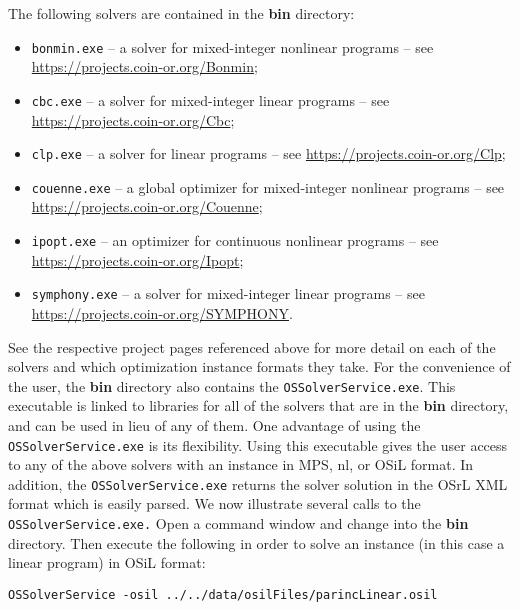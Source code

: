 \documentclass[11pt]{article}
\renewcommand{\{}{{\char"7B}}
\renewcommand{\}}{{\char"7D}}
\renewcommand{\^}{{\char"0D}}
\renewcommand{\'}{{\char"0D}}
\begin{document}
The following solvers are contained in the {\bf bin} directory:
\begin{itemize}
\item {\tt bonmin.exe} -- a solver for mixed-integer nonlinear programs
  -- see \url{https://projects.coin-or.org/Bonmin};

\item {\tt cbc.exe} --  a solver for mixed-integer linear programs
  -- see \url{https://projects.coin-or.org/Cbc};

\item {\tt clp.exe} -- a solver for linear programs
  -- see \url{https://projects.coin-or.org/Clp};

\item {\tt couenne.exe} -- a global optimizer for mixed-integer nonlinear programs
  -- see \url{https://projects.coin-or.org/Couenne};

\item {\tt ipopt.exe} -- an optimizer for continuous nonlinear programs
  -- see \url{https://projects.coin-or.org/Ipopt};

\item {\tt symphony.exe} -- a solver for mixed-integer linear programs
  -- see \url{https://projects.coin-or.org/SYMPHONY}.
\end{itemize}

See the respective project pages referenced above for  more detail on each of the solvers 
and which optimization instance formats they take.  For the convenience of the user, 
the {\bf bin} directory also contains the {\tt OSSolverService.exe}.  This executable is linked 
to libraries for all of the  solvers that are in the {\bf bin} directory, and can be used 
in lieu of any of them. One advantage of using the {\tt OSSolverService.exe}  is its flexibility. 
Using this executable gives the user access to any of the above solvers with an instance 
in MPS, nl, or OSiL format. In addition, the {\tt OSSolverService.exe} returns the solver 
solution in the OSrL XML format which is easily parsed.  We now illustrate several calls 
to the {\tt OSSolverService.exe.}   
Open a command window and change into the {\bf bin} directory. Then
execute the following in order to solve an instance (in this case a linear program) 
in OSiL format:


\begin{verbatim}
OSSolverService -osil ../../data/osilFiles/parincLinear.osil
\end{verbatim}
\end{document}
